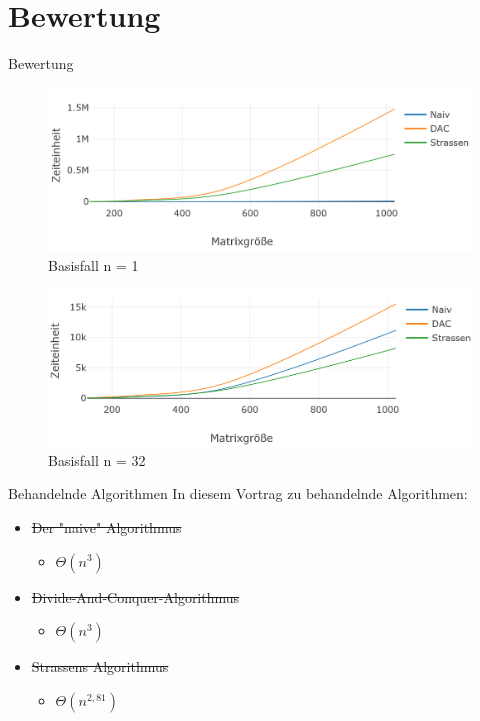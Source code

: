 \documentclass[aspectratio=169]{beamer}
\begin{document}
\section{Bewertung}
\begin{frame}{Bewertung}

     {
        \begin{figure}[H]
            \centering
            \includegraphics[width=\linewidth]{images/basisfallnot.png}
            \caption{Basisfall n = 1}
        \end{figure}
    }{
        \begin{figure}[H]
            \centering
            \includegraphics[width=\linewidth]{images/basisfallmod.png}
            \caption{Basisfall n = 32}
        \end{figure}
    }
    \pause[2]
\end{frame}

\begin{frame}{Behandelnde Algorithmen}
    In diesem Vortrag zu behandelnde Algorithmen:
    \begin{itemize}
        \item \st{Der "naive" Algorithmus}
        \begin{itemize}
            \item $\Theta(n^3)$
        \end{itemize}
        \item \st{Divide-And-Conquer-Algorithmus}
        \begin{itemize}
            \item $\Theta(n^3)$
        \end{itemize}
        \item \st{Strassens Algorithmus}
        \begin{itemize}
            \item $\Theta(n^{2,81})$
        \end{itemize}
    \end{itemize}
\end{frame}
\end{document}
